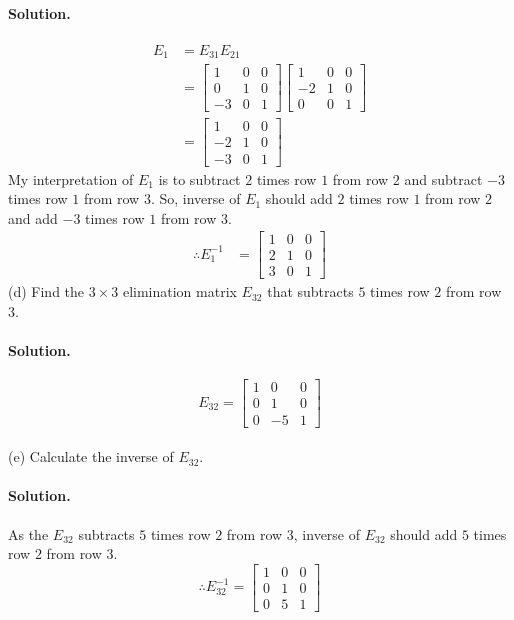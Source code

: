 \paragraph*{Solution.}
\begin{align*}
    E_1 &= E_{31}E_{21}\\
    &=\begin{bmatrix}
        1&0&0\\
        0&1&0\\
        -3&0&1
    \end{bmatrix} \begin{bmatrix}
        1&0&0\\
        -2&1&0\\
        0&0&1
    \end{bmatrix}\\
    &=\begin{bmatrix}
        1&0&0\\
        -2&1&0\\
        -3&0&1
    \end{bmatrix}
\end{align*}
My interpretation of $E_1$ is to subtract $2$ times row $1$ from row $2$ and subtract $-3$ times row $1$ from row $3$.
So, inverse of $E_1$ should add $2$ times row $1$ from row $2$ and add $-3$ times row $1$ from row $3$.
\begin{align*}
    \therefore E_1^{-1} &= \begin{bmatrix}
        1&0&0\\
        2&1&0\\
        3&0&1
    \end{bmatrix}
\end{align*}
\newpage
(d) Find the $3\times 3$ elimination matrix $E_{32}$ that subtracts $5$ times row $2$ from row $3$.
\paragraph*{Solution.}
$$E_{32} = \begin{bmatrix}
    1&0&0\\0&1&0\\0&-5&1
\end{bmatrix}$$\\

(e) Calculate the inverse of $E_{32}$.
\paragraph*{Solution.}
As the $E_{32}$ subtracts $5$ times row $2$ from row $3$, inverse of $E_{32}$ should add $5$ times row $2$ from row $3$.
$$\therefore E_{32}^{-1}=\begin{bmatrix}
    1&0&0\\0&1&0\\0&5&1
\end{bmatrix}$$\\


